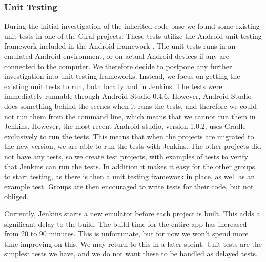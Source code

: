 \subsubsection{Unit Testing}
During the initial investigation of the inherited code base we found some existing unit tests in one of the Giraf projects. These tests utilize the Android unit testing framework included in the Android framework \parencite{AndroidUnit}. The unit tests runs in an emulated Android environment, or on actual Android devices if any are connected to the computer. We therefore decide to postpone any further investigation into unit testing frameworks. Instead, we focus on getting the existing unit tests to run, both locally and in Jenkins. The tests were immediately runnable through Android Studio 0.4.6. However, Android Studio does something behind the scenes when it runs the tests, and therefore we could not run them from the command line, which means that we cannot run them in Jenkins. However, the most recent Android studio, version 1.0.2, uses Gradle exclusively to run the tests. This means that when the projects are migrated to the new version, we are able to run the tests with Jenkins.
The other projects did not have any tests, so we create test projects, with examples of tests to verify that Jenkins can run the tests. In addition it makes it easy for the other groups to start testing, as there is then a unit testing framework in place, as well as an example test. Groups are then encouraged to write tests for their code, but not obliged.

Currently, Jenkins starts a new emulator before each project is built. This adds a significant delay to the build. The build time for the entire app has increased from 20 to 90 minutes. This is unfortunate, but for now we won't spend more time improving on this. We may return to this in a later sprint. Unit tests are the simplest tests we have, and we do not want these to be handled as delayed tests.

